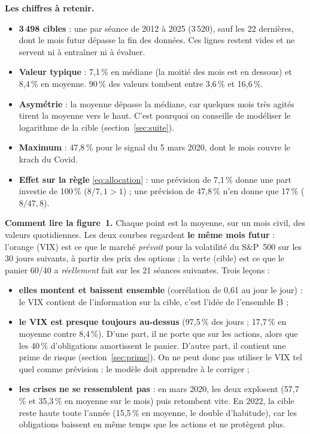 \documentclass[10pt,a4paper]{article}
\begin{document}
\textbf{Les chiffres à retenir.}
\begin{itemize}[nosep,leftmargin=*]
  \item \textbf{3\,498 cibles} : une par séance de 2012 à 2025 (3\,520), sauf les 22 dernières, dont le mois futur dépasse la fin des données. Ces lignes restent vides et ne servent ni à entraîner ni à évaluer.
  \item \textbf{Valeur typique} : 7,1\,\% en médiane (la moitié des mois est en dessous) et 8,4\,\% en moyenne. 90\,\% des valeurs tombent entre 3,6\,\% et 16,6\,\%.
  \item \textbf{Asymétrie} : la moyenne dépasse la médiane, car quelques mois très agités tirent la moyenne vers le haut. C'est pourquoi on conseille de modéliser le logarithme de la cible (section~\ref{sec:suite}).
  \item \textbf{Maximum} : 47,8\,\% pour le signal du 5 mars 2020, dont le mois couvre le krach du Covid.
  \item \textbf{Effet sur la règle} \eqref{eq:allocation} : une prévision de 7,1\,\% donne une part investie de 100\,\% ($8/7{,}1>1$) ; une prévision de 47,8\,\% n'en donne que 17\,\% ($8/47{,}8$).
\end{itemize}

\textbf{Comment lire la figure~1.} Chaque point est la moyenne, sur un mois civil, des valeurs quotidiennes. Les deux courbes regardent \textbf{le même mois futur} : l'orange (VIX) est ce que le marché \emph{prévoit} pour la volatilité du S\&P~500 sur les 30 jours suivants, à partir des prix des options ; la verte (cible) est ce que le panier 60/40 a \emph{réellement} fait sur les 21 séances suivantes. Trois leçons :
\begin{itemize}[nosep,leftmargin=*]
  \item \textbf{elles montent et baissent ensemble} (corrélation de 0,61 au jour le jour) : le VIX contient de l'information sur la cible, c'est l'idée de l'ensemble B ;
  \item \textbf{le VIX est presque toujours au-dessus} (97,5\,\% des jours ; 17,7\,\% en moyenne contre 8,4\,\%). D'une part, il ne porte que sur les actions, alors que les 40\,\% d'obligations amortissent le panier. D'autre part, il contient une prime de risque (section~\ref{sec:prime}). On ne peut donc pas utiliser le VIX tel quel comme prévision : le modèle doit apprendre à le corriger ;
  \item \textbf{les crises ne se ressemblent pas} : en mars 2020, les deux explosent (57,7\,\% et 35,3\,\% en moyenne sur le mois) puis retombent vite. En 2022, la cible reste haute toute l'année (15,5\,\% en moyenne, le double d'habitude), car les obligations baissent en même temps que les actions et ne protègent plus.
\end{itemize}
\end{document}
